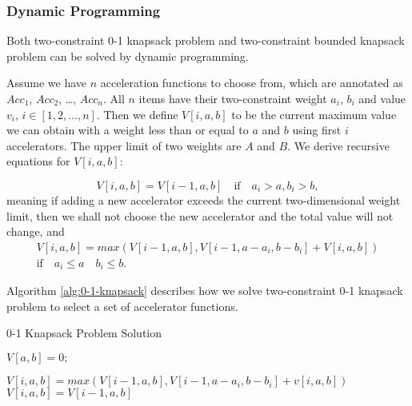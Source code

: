 \subsubsection{Dynamic Programming}

Both two-constraint 0-1 knapsack problem and two-constraint bounded knapsack problem can be solved
by dynamic programming. 


Assume we have $n$ acceleration functions to choose from, which are
annotated as $Acc_1$, $Acc_2$, \ldots, $Acc_n$. All $n$ items have
their two-constraint weight $a_i$, $b_i$ and value $v_i$, $i \in [1,
  2, \ldots, n]$. Then we define $V[i, a, b]$ to be the current
maximum value we can obtain with a weight less than or equal to $a$
and $b$ using first $i$ accelerators. The upper limit of two weights
are $A$ and $B$. We derive recursive equations for $V[i, a, b]$:

\begin{equation}
V[i, a, b] = V[i-1, a, b] \quad \text{if} \quad a_i > a, b_i > b,
\end{equation}
meaning if adding a new accelerator exceeds the current
two-dimensional weight limit, then we shall not choose the new
accelerator and the total value will not change, and
\begin{equation}
\begin{array}{c}
	V[i, a, b] = max(V[i-1, a, b], V[i-1, a - a_i, b - b_i] + V[i, a, b])\\
	\text{if} \quad a_i \leq a \quad b_i \leq b.
\end{array}
\end{equation}

Algorithm \ref{alg:0-1-knapsack} describes how we solve two-constraint 0-1
knapsack problem to select a set of accelerator functions. 

\begin{algorithm}[htb]
\scriptsize
\caption{ 0-1 Knapsack Problem Solution}
\label{alg:0-1-knapsack}
\begin{algorithmic}[1] 
    	\STATE $ V[a, b] = 0; $
    \ENDFOR
\ENDFOR
{} 
    	
            	\STATE $V[i, a, b] = max(V[i-1, a, b], V[i-1, a - a_i, b - b_i] + v[i, a, b]) $
        	\ELSE
            	\STATE $V[i, a, b] = V[i-1, a, b]$
        	\ENDIF
        \ENDFOR
    \ENDFOR
\ENDFOR
\end{algorithmic}
\end{algorithm}

